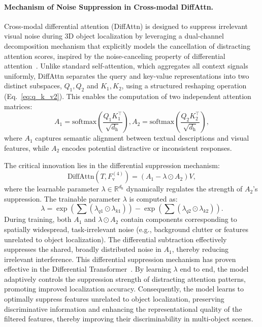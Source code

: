 \documentclass[letterpaper]{article} %
\begin{document}
\paragraph{Mechanism of Noise Suppression in Cross-modal DiffAttn.} 
Cross-modal differential attention (DiffAttn) is designed to suppress irrelevant visual noise during 3D object localization by leveraging a dual-channel decomposition mechanism that explicitly models the cancellation of distracting attention scores, inspired by the noise-canceling property of differential attention~\cite{yeDifferentialTransformer2024}.
Unlike standard self-attention, which aggregates all context signals uniformly, DiffAttn separates the query and key-value representations into two distinct subspaces, $Q_1, Q_2$ and $K_1, K_2$, using a structured reshaping operation (Eq.~\ref{eq:q_k_v2}). This enables the computation of two independent attention matrices:
\begin{equation*}
	A_1 = \text{softmax}\left(\frac{Q_1 K_1^\intercal}{\sqrt{d_\mathrm{h}}}\right), 
	A_2 = \text{softmax}\left(\frac{Q_2 K_2^\intercal}{\sqrt{d_\mathrm{h}}}\right),
\end{equation*}
where $A_1$ captures semantic alignment between textual descriptions and visual features, while $A_2$ encodes potential distractive or inconsistent responses.

The critical innovation lies in the differential suppression mechanism:
\begin{equation}
	\text{DiffAttn}(T, F_{\text{v}}^{(4)}) = (A_1 - \lambda \odot A_2)V,
\end{equation}
where the learnable parameter $\lambda \in \mathbb{R}^{d_\mathrm{h}}$ dynamically regulates the strength of $A_2$'s suppression.
The trainable parameter $\lambda$ is computed as:
\[
\lambda = \exp\left(\sum (\lambda_{q1} \odot \lambda_{k1})\right) - \exp\left(\sum (\lambda_{q2} \odot \lambda_{k2})\right).
\]
During training, both $A_1$ and $\lambda \odot A_2$ contain components corresponding to spatially widespread, task-irrelevant noise (e.g.,
background clutter or features unrelated to object localization). The differential subtraction effectively suppresses the shared, broadly
distributed noise in $A_1$, thereby reducing irrelevant interference. This differential suppression mechanism has proven effective in the
Differential Transformer~\cite{yeDifferentialTransformer2024}. By learning $\lambda$ end to end, the model adaptively controls the suppression
strength of distracting attention patterns, promoting improved localization accuracy. Consequently, the model learns to optimally suppress
features unrelated to object localization, preserving discriminative information and enhancing the representational quality of the filtered
features, thereby improving their discriminability in multi-object scenes.
\end{document}
